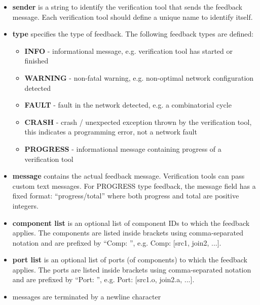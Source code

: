 \begin{itemize}
    \item \textbf{sender} is a string to identify the verification tool that
    sends the feedback message. Each verification tool should define a unique
    name to identify itself.
    
    \item \textbf{type} specifies the type of feedback. The following feedback
    types are defined:
    \begin{itemize}
        \item \textbf{INFO} - informational message, e.g. verification tool has started or finished
        \item \textbf{WARNING} - non-fatal warning, e.g. non-optimal network configuration detected
        \item \textbf{FAULT} - fault in the network detected, e.g. a combinatorial cycle
        \item \textbf{CRASH} - crash / unexpected exception thrown by the verification tool,
        this indicates a programming error, not a network fault
        \item \textbf{PROGRESS} - informational message containing progress of a verification tool
    \end{itemize}

    \item \textbf{message} contains the actual feedback message. Verification tools can pass
    custom text messages. For PROGRESS type feedback, the message field has a fixed format:
    ``progress/total'' where both progress and total are positive integers.
    
    \item \textbf{component list} is an optional list of component IDs to which the feedback
    applies. The components are listed inside brackets using comma-separated notation and are
    prefixed by ``Comp: '', e.g. Comp: [src1, join2, ...].

    \item \textbf{port list} is an optional list of ports (of components) to which the feedback
    applies. The ports are listed inside brackets using comma-separated notation and are
    prefixed by ``Port: '', e.g. Port: [src1.o, join2.a, ...].
    
    \item messages are terminated by a newline character
    
\end{itemize}


